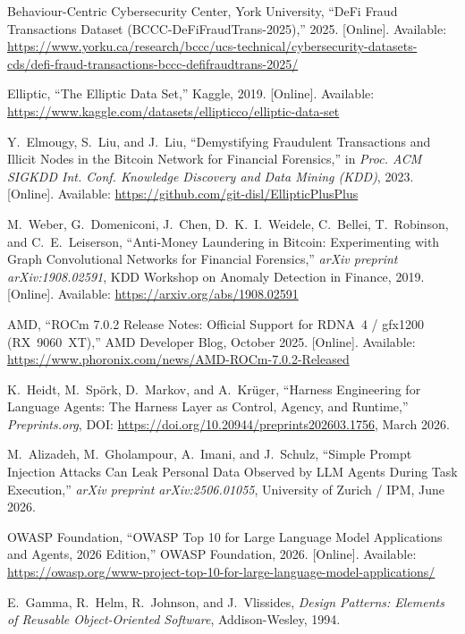 \documentclass[12pt,a4paper]{report}
\begin{document}
{\begin{enumerate}[label={[\arabic*]}]

\item Behaviour-Centric Cybersecurity Center, York University, ``DeFi Fraud Transactions Dataset (BCCC-DeFiFraudTrans-2025),'' 2025. [Online]. Available: \url{https://www.yorku.ca/research/bccc/ucs-technical/cybersecurity-datasets-cds/defi-fraud-transactions-bccc-defifraudtrans-2025/}

\item Elliptic, ``The Elliptic Data Set,'' Kaggle, 2019. [Online]. Available: \url{https://www.kaggle.com/datasets/ellipticco/elliptic-data-set}

\item Y.~Elmougy, S.~Liu, and J.~Liu, ``Demystifying Fraudulent Transactions and Illicit Nodes in the Bitcoin Network for Financial Forensics,'' in \textit{Proc. ACM SIGKDD Int. Conf. Knowledge Discovery and Data Mining (KDD)}, 2023. [Online]. Available: \url{https://github.com/git-disl/EllipticPlusPlus}

\item M.~Weber, G.~Domeniconi, J.~Chen, D.~K.~I.~Weidele, C.~Bellei, T.~Robinson, and C.~E.~Leiserson, ``Anti-Money Laundering in Bitcoin: Experimenting with Graph Convolutional Networks for Financial Forensics,'' \textit{arXiv preprint arXiv:1908.02591}, KDD Workshop on Anomaly Detection in Finance, 2019. [Online]. Available: \url{https://arxiv.org/abs/1908.02591}

\item AMD, ``ROCm 7.0.2 Release Notes: Official Support for RDNA~4 / gfx1200 (RX~9060~XT),'' AMD Developer Blog, October 2025. [Online]. Available: \url{https://www.phoronix.com/news/AMD-ROCm-7.0.2-Released}


\item K.~Heidt, M.~Sp\"{o}rk, D.~Markov, and A.~Kr\"{u}ger, ``Harness Engineering
for Language Agents: The Harness Layer as Control, Agency, and Runtime,''
\textit{Preprints.org}, DOI: \url{https://doi.org/10.20944/preprints202603.1756},
March 2026.

\item M.~Alizadeh, M.~Gholampour, A.~Imani, and J.~Schulz, ``Simple Prompt
Injection Attacks Can Leak Personal Data Observed by LLM Agents During Task
Execution,'' \textit{arXiv preprint arXiv:2506.01055}, University of Zurich / IPM,
June 2026.

\item OWASP Foundation, ``OWASP Top 10 for Large Language Model Applications and
Agents, 2026 Edition,'' OWASP Foundation, 2026. [Online]. Available:
\url{https://owasp.org/www-project-top-10-for-large-language-model-applications/}

\item E.~Gamma, R.~Helm, R.~Johnson, and J.~Vlissides, \textit{Design Patterns:
Elements of Reusable Object-Oriented Software}, Addison-Wesley, 1994.

\end{enumerate}
}
\end{document}
